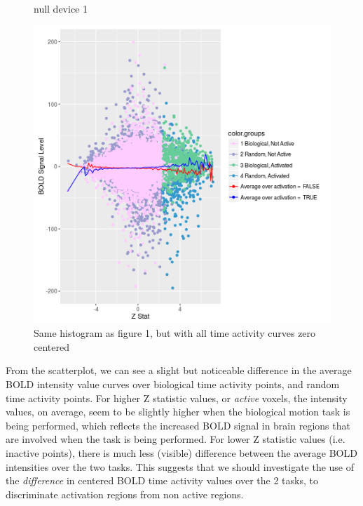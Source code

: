 \documentclass{report}
\begin{document}
\begin{figure}

\caption{Same histogram as figure 1, but with all time activity curves zero centered}
\label{fig:figure2}
\begin{Schunk}
\begin{Soutput}
null device 
          1 
\end{Soutput}
\end{Schunk}

\includegraphics{fig2}
\end{figure}


From the scatterplot, we can see a slight but noticeable difference in the average BOLD intensity value curves over biological time activity points, and random time activity points. For higher Z statistic values, or \textit{active} voxels, the intensity values, on average, seem to be slightly higher when the biological motion task is being performed, which reflects the increased BOLD signal in brain regions that are involved when the task is being performed. For lower Z statistic values (i.e. inactive points), there is much less (visible) difference between the average BOLD intensities over the two tasks. This suggests that we should investigate the use of the \textit{difference} in centered BOLD time activity values over the 2 tasks, to discriminate activation regions from non active regions.
\end{document}
